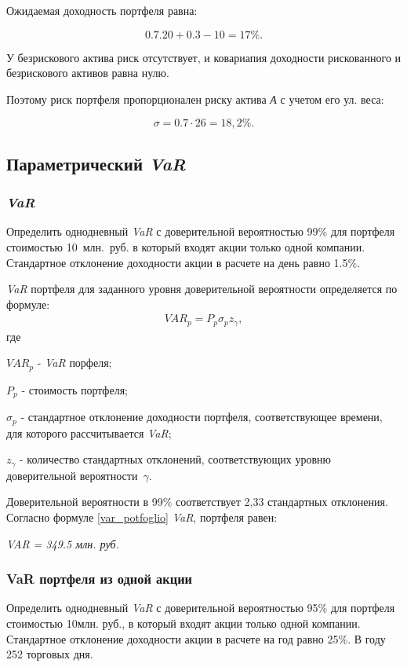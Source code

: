 \documentclass[12pt, table, a4paper,twoside]{exam}
\begin{document}
\begin{questions}
\begin{solution}[12em]

\raggedright
Ожидаемая доходность портфеля равна:

$$0.7.20 + 0.3-10 = 17\%.$$

У безрискового актива риск отсутствует, и ковариапия доходности рискованного и безрискового активов равна нулю.

Поэтому риск портфеля пропорционален риску актива \textit{А} с учетом его ул. веса:

$$\sigma = 0.7 \cdot 26 = 18,2\%.$$

\end{solution}

\subsection{Параметрический \textit{VaR}}
\subsubsection{\textit{VaR}}
\question[10] Определить однодневный \textit{VaR} с доверительной вероятностью 99\% для портфеля стоимостью 10~млн.~руб. в который входят акции только одной компании. Стандартное отклонение доходности акции в расчете на день равно 1.5\%.

\begin{solution}[12em]

\raggedright
\textit{VaR }портфеля для заданного уровня доверительной вероятности определяется по формуле:
\begin{align}
\label{var_potfoglio}
VAR_p=P_p \sigma_p z_{\gamma},
\end{align}
где

$VAR_p$ - \textit{VaR }порфеля;

$P_p$ - стоимость портфеля;

$\sigma_p$ - стандартное отклонение доходности портфеля, соответствующее времени, для которого рассчитывается \textit{VaR};

$z_{\gamma}$ - количество стандартных отклонений, соответствующих уровню доверительной вероятности~$\gamma$.

Доверительной вероятности в 99\% соответствует 2,33 стандартных отклонения. Согласно формуле \eqref{var_potfoglio} \textit{VaR}, портфеля равен:

\textit{VAR = 349.5 млн. руб.}
\end{solution}


\subsubsection{VaR портфеля из одной акции}
\question[10] Определить однодневный \textit{VaR} с доверительной вероятностью 95\% для портфеля стоимостью 10млн. руб., в который входят акции только одной компании. Стандартное отклонение доходности акции в расчете на год равно 25\%. В году 252 торговых дня.


\end{questions}
\end{document}
